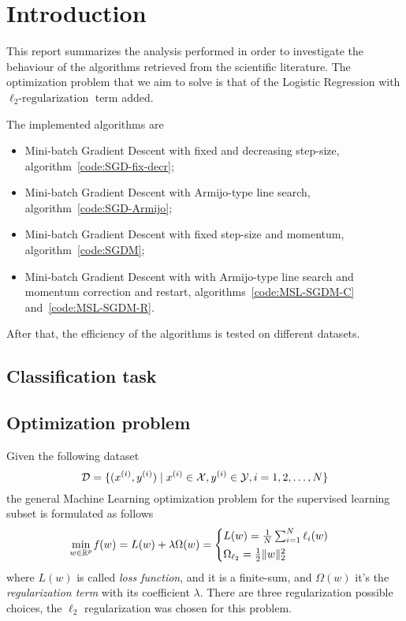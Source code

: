 \section{Introduction}\label{sc:intro}


This report summarizes the analysis performed in order to investigate the behaviour of the algorithms retrieved from the scientific literature. The optimization problem that we aim to solve is that of the Logistic Regression with $\ell_2\text{-regularization}$ term added.

The implemented algorithms are
\begin{itemize}
\item Mini-batch Gradient Descent with fixed and decreasing step-size, algorithm~\vref{code:SGD-fix-decr};
\item Mini-batch Gradient Descent with Armijo-type line search, algorithm~\vref{code:SGD-Armijo};
\item Mini-batch Gradient Descent with fixed step-size and momentum, algorithm~\vref{code:SGDM};
\item Mini-batch Gradient Descent with with Armijo-type line search and momentum correction and restart, algorithms~\ref{code:MSL-SGDM-C} and~\vref{code:MSL-SGDM-R}.
\end{itemize}

After that, the efficiency of the algorithms is tested on different datasets.

\subsection{Classification task}

\subsection{Optimization problem}

Given the following dataset
\[
\mathcal{D}=\{(x^{(i)}, y^{(i)})\mid x^{(i)}\in\mathcal{X}, y^{(i)}\in\mathcal{Y}, i=1,2,\dots,N\}
\]
the general Machine Learning optimization problem for the supervised learning subset is formulated as follows
\[
\min_{w\in\mathbb{R}^p}\operatorname*{\mathit{f}}(w)=L(w)+\lambda\Omega(w)=
\begin{cases}
L(w)=\frac{1}{N}\sum_{i=1}^N\ell_i(w) \\[0.5ex]
\Omega_{\ell_2}=\frac{1}{2}\lVert w\rVert_2^2
\end{cases}
\]
where $L(w)$ is called \emph{loss function}, and it is a finite-sum, and $\Omega(w)$ it's the \emph{regularization term} with its coefficient $\lambda$. There are three regularization possible choices, the $\ell_2$ regularization was chosen for this problem.

